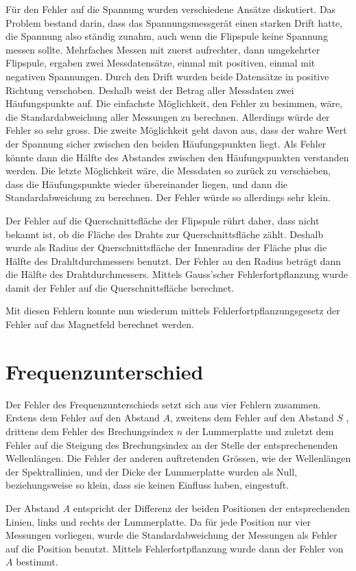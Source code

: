 \documentclass[a4paper,parskip,11pt, DIV12]{scrreprt}
\begin{document}
	Für den Fehler auf die Spannung wurden verschiedene Ansätze diskutiert. Das Problem bestand darin, dass das Spannungsmessgerät einen starken Drift hatte, die Spannung also ständig zunahm, auch wenn die Flipspule keine Spannung messen sollte. Mehrfaches Messen mit zuerst aufrechter, dann umgekehrter Flipspule, ergaben zwei Messdatensätze, einmal mit positiven, einmal mit negativen Spannungen. Durch den Drift wurden beide Datensätze in positive Richtung verschoben. Deshalb weist der Betrag aller Messdaten zwei Häufungspunkte auf. Die einfachste Möglichkeit, den Fehler zu besimmen, wäre, die Standardabweichung aller Messungen zu berechnen. Allerdings würde der Fehler so sehr gross. Die zweite Möglichkeit geht davon aus, dass der wahre Wert der Spannung sicher zwischen den beiden Häufungspunkten liegt. Als Fehler könnte dann die Hälfte des Abstandes zwischen den Häufungspunkten verstanden werden. Die letzte Möglichkeit wäre, die Messdaten so zurück zu verschieben, dass die Häufungspunkte wieder übereinander liegen, und dann die Standardabweichung zu berechnen. Der Fehler würde so allerdings sehr klein.
	
	Der Fehler auf die Querschnittsfläche der Flipspule rührt daher, dass nicht bekannt ist, ob die Fläche des Drahts zur Querschnittsfläche zählt. Deshalb wurde als Radius der Querschnittsfläche der Innenradius der Fläche plus die Hälfte des Drahltdurchmessers benutzt. Der Fehler au den Radius beträgt dann die Hälfte des Drahtdurchmessers. Mittels Gauss'scher Fehlerfortpflanzung wurde damit der Fehler auf die Querschnittsfläche berechnet. 
	
	Mit diesen Fehlern konnte nun wiederum mittels Fehlerfortpflanzungsgesetz der Fehler auf das Magnetfeld berechnet werden.
	 
	\section{Frequenzunterschied}
	Der Fehler des Frequenzunterschieds setzt sich aus vier Fehlern zusammen. Erstens dem Fehler auf den Abstand $A$, zweitens dem Fehler auf den Abstand $S$ , drittens dem Fehler des Brechungsindex $n$ der Lummerplatte und zuletzt dem Fehler auf die Steigung des Brechungsindex an der Stelle der entsprechenenden Wellenlängen. Die Fehler der anderen auftretenden Grössen, wie der Wellenlängen der Spektrallinien, und der Dicke der Lummerplatte wurden als Null, beziehungsweise so klein, dass sie keinen Einfluss haben, eingestuft. 
	
	Der Abstand $A$ entspricht der Differenz der beiden Positionen der entsprechenden Linien, links und rechts der Lummerplatte. Da für jede Position nur vier Messungen vorliegen, wurde die Standardabweichung der Messungen als Fehler auf die Position benutzt. Mittels Fehlerfortpflanzung wurde dann der Fehler von $A$ bestimmt.
	
\end{document}
